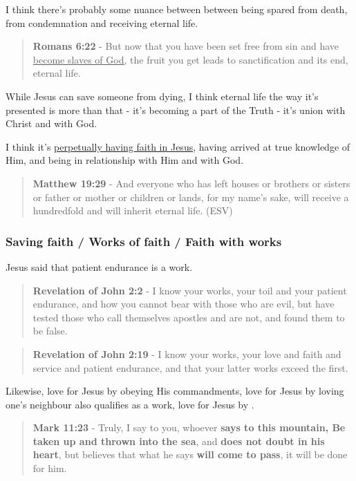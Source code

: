 \documentclass[11pt]{article}
\begin{document}
I think there's probably some nuance between between being spared from death, from condemnation and receiving eternal life.

\begin{quote}
\textbf{Romans 6:22} - But now that you have been set free from sin and have \uline{become slaves of God,} the fruit you get leads to sanctification and its end, eternal life.
\end{quote}

While Jesus can save someone from dying, I think eternal life the way it's presented is more than that - it's becoming a part of the Truth - it's union with Christ and with God.

I think it's \uline{perpetually having faith in Jesus}, having arrived at true knowledge of Him, and being in relationship with Him and with God.

\begin{quote}
\textbf{Matthew 19:29} - And everyone who has left houses or brothers or sisters or father or mother or children or lands, for my name's sake, will receive a hundredfold and will inherit eternal life. (ESV)
\end{quote}

\subsubsection{Saving faith / Works of faith / Faith with works}
\label{sec:orga9869ac}
Jesus said that patient endurance is a work.

\begin{quote}
\textbf{Revelation of John 2:2} - I know your works, your toil and your patient endurance, and how you cannot bear with those who are evil, but have tested those who call themselves apostles and are not, and found them to be false.
\end{quote}

\begin{quote}
\textbf{Revelation of John 2:19} - I know your works, your love and faith and service and patient endurance, and that your latter works exceed the first.
\end{quote}

Likewise, love for Jesus by obeying His commandments, love for Jesus by loving one's neighbour also qualifies as a work, love for Jesus by .

\begin{quote}
\textbf{Mark 11:23} - Truly, I say to you, whoever \textbf{says to this mountain, Be taken up and thrown into the sea}, and \textbf{does not doubt in his heart}, but believes that what he says \textbf{will come to pass}, it will be done for him.
\end{quote}
\end{document}
